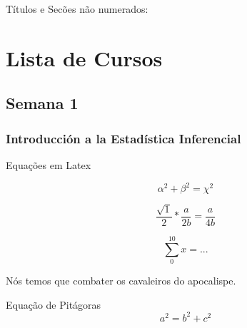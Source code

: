 \documentclass{article}\usepackage[]{graphicx}\usepackage[]{color}
\begin{document}
Títulos e Secões não numerados:
\section*{Lista de Cursos}
\subsection*{Semana 1}
\subsubsection*{Introducción a la Estadística Inferencial}

Equações em Latex

$$\alpha^2 + \beta^2 = \chi^2$$

$$\frac{\sqrt{1}}{2} * \frac{a}{2b} = \frac{a}{4b}$$ 

$$\sum_0^{10} x = ...$$ 

Nós temos que combater os cavaleiros do apocalispe.

\vspace{0.5cm}
Equação de Pitágoras
\vspace{0.5cm}
$$a^2 = b^2 + c^2$$
\end{document}
